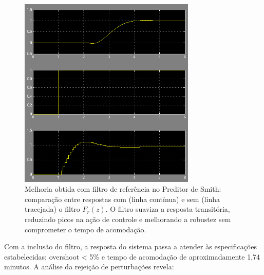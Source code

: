\documentclass[a4paper,12pt]{article}
\begin{document}
   \begin{figure}[H]
  \centering
  \includegraphics[width=0.75\textwidth]{Imagens/q13.png}
  \caption{Melhoria obtida com filtro de referência no Preditor de Smith: comparação entre respostas com (linha contínua) e sem (linha tracejada) o filtro $F_r(z)$. O filtro suaviza a resposta transitória, reduzindo picos na ação de controle e melhorando a robustez sem comprometer o tempo de acomodação.}
  \end{figure}

Com a inclusão do filtro, a resposta do sistema passa a atender às especificações estabelecidas: overshoot < 5\% e tempo de acomodação de aproximadamente 1,74 minutos. A análise da rejeição de perturbações revela:
\end{document}
